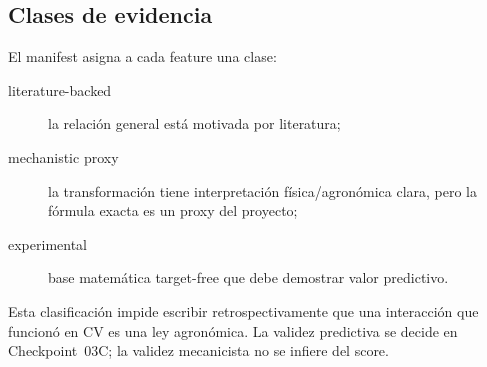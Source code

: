 \subsection{Clases de evidencia}

El manifest asigna a cada feature una clase:
\begin{description}
\item[literature-backed] la relación general está motivada por literatura;
\item[mechanistic proxy] la transformación tiene interpretación física/agronómica clara,
pero la fórmula exacta es un proxy del proyecto;
\item[experimental] base matemática target-free que debe demostrar valor predictivo.
\end{description}

Esta clasificación impide escribir retrospectivamente que una interacción que funcionó en CV
es una ley agronómica. La validez predictiva se decide en Checkpoint~03C; la validez
mecanicista no se infiere del score.
